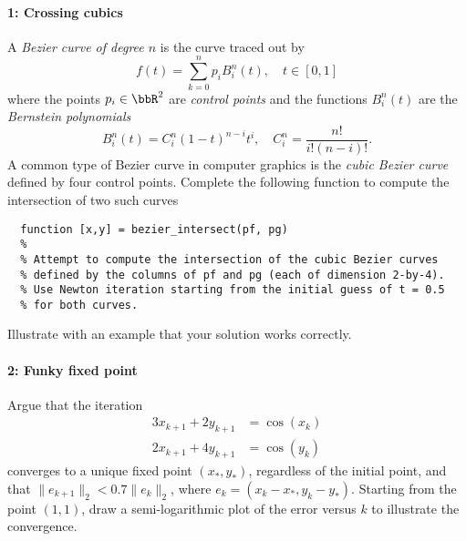\documentclass[12pt, leqno]{article}
\begin{document}

\paragraph*{1: Crossing cubics}
A {\em Bezier curve of degree $n$} is the curve traced out by
\[
  f(t) = \sum_{k=0}^n p_i B_i^n(t), \quad t \in [0,1]
\]
where the points $p_i \in \bbR^2$ are {\em control points} and
the functions $B_i^n(t)$ are the {\em Bernstein polynomials}
\[
  B_i^n(t) = C^n_i (1-t)^{n-i} t^i, \quad C^n_i = \frac{n!}{i!(n-i)!}.
\]
A common type of Bezier curve in computer graphics is the {\em cubic
  Bezier curve} defined by four control points.  Complete the
following function to compute the intersection of two such curves
\begin{lstlisting}
  function [x,y] = bezier_intersect(pf, pg)
  %
  % Attempt to compute the intersection of the cubic Bezier curves
  % defined by the columns of pf and pg (each of dimension 2-by-4).
  % Use Newton iteration starting from the initial guess of t = 0.5
  % for both curves.
\end{lstlisting}
Illustrate with an example that your solution works correctly.

\paragraph*{2: Funky fixed point}
Argue that the iteration
\begin{align*}
  3x_{k+1} + 2y_{k+1} &= \cos(x_k) \\
  2x_{k+1} + 4y_{k+1} &= \cos(y_k)
\end{align*}
converges to a unique fixed point $(x_*, y_*)$, regardless of
the initial point, and that $\|e_{k+1}\|_2 < 0.7 \|e_k\|_2$, where
$e_k = (x_k-x_*, y_k-y_*)$.  Starting from the point $(1,1)$,
draw a semi-logarithmic plot of the error versus $k$ to illustrate
the convergence.
\end{document}
